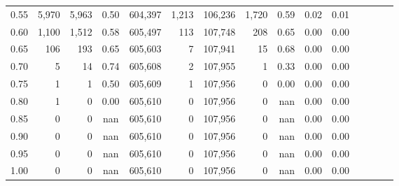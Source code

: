 \begin{tabular}{rrrcrrrrrrrrrrr}
0.55 &    5,970 &   5,963 &                                       0.50 &  604,397 &    1,213 &  106,236 &    1,720 &  0.59 &  0.02 &                         0.01 \\
0.60 &    1,100 &   1,512 &                                       0.58 &  605,497 &      113 &  107,748 &      208 &  0.65 &  0.00 &                         0.00 \\
0.65 &      106 &     193 &                                       0.65 &  605,603 &        7 &  107,941 &       15 &  0.68 &  0.00 &                         0.00 \\
0.70 &        5 &      14 &                                       0.74 &  605,608 &        2 &  107,955 &        1 &  0.33 &  0.00 &                         0.00 \\
0.75 &        1 &       1 &                                       0.50 &  605,609 &        1 &  107,956 &        0 &  0.00 &  0.00 &                         0.00 \\
0.80 &        1 &       0 &                                       0.00 &  605,610 &        0 &  107,956 &        0 &   nan &  0.00 &                         0.00 \\
0.85 &        0 &       0 &                                        nan &  605,610 &        0 &  107,956 &        0 &   nan &  0.00 &                         0.00 \\
0.90 &        0 &       0 &                                        nan &  605,610 &        0 &  107,956 &        0 &   nan &  0.00 &                         0.00 \\
0.95 &        0 &       0 &                                        nan &  605,610 &        0 &  107,956 &        0 &   nan &  0.00 &                         0.00 \\
1.00 &        0 &       0 &                                        nan &  605,610 &        0 &  107,956 &        0 &   nan &  0.00 &                         0.00 \\
\bottomrule
\end{tabular}
